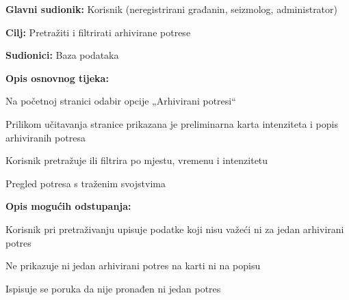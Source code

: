 			\noindent {}
			\begin{packed_item}
				
				\item \textbf{Glavni sudionik:} Korisnik (neregistrirani građanin, seizmolog, administrator)
				\item \textbf{Cilj:} Pretražiti i filtrirati arhivirane potrese
				\item \textbf{Sudionici:} Baza podataka
				
				\item \textbf{Opis osnovnog tijeka:}
				
				\item[] \begin{packed_enum}
					\item Na početnoj stranici odabir opcije „Arhivirani potresi“
					\item Prilikom učitavanja stranice prikazana je preliminarna karta intenziteta i popis arhiviranih potresa
					\item Korisnik pretražuje ili filtrira po mjestu, vremenu i intenzitetu
					\item Pregled potresa s traženim svojstvima
				\end{packed_enum}
				
				\item  \textbf{Opis mogućih odstupanja:}
				
				\item[] \begin{packed_item}
					
					\item[3.a] Korisnik pri pretraživanju upisuje podatke koji nisu važeći ni za jedan arhivirani potres
					\item[] \begin{packed_enum}
						
						\item Ne prikazuje ni jedan arhivirani potres na karti ni na popisu
						\item Ispisuje se poruka da nije pronađen ni jedan potres
						
					\end{packed_enum}
					
				\end{packed_item}
				
			\end{packed_item}
			\noindent {}
